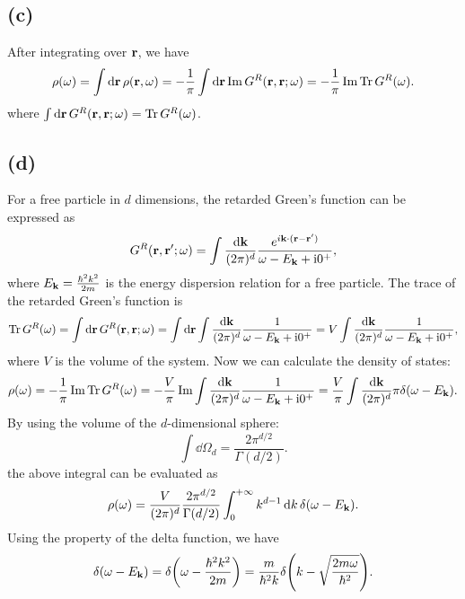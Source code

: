 \documentclass{article}
\newcommand{\ii}{\mathrm{i}}
\begin{document}
\subsection*{(c)}
After integrating over $\vb{r}$, we have
\begin{equation}
    \rho(\omega)=\int \dd{\vb{r}}\rho(\vb{r},\omega)=-\frac{1}{\pi}\int \dd{\vb{r}}\Im G^{R}(\vb{r},\vb{r};\omega)=-\frac{1}{\pi}\Im \Tr G^{R}(\omega).
\end{equation}
where $\int \dd{\vb{r}}G^{R}(\vb{r},\vb{r};\omega)=\Tr G^{R}(\omega)$.

\subsection*{(d)}
For a free particle in $d$ dimensions, the retarded Green's function can be expressed as
\begin{equation}
    G^{R}(\vb{r},\vb{r}';\omega)=\int \frac{\dd{\vb{k}}}{(2\pi)^d}\frac{e^{i\vb{k}\cdot(\vb{r}-\vb{r'})}}{\omega-E_{\vb{k}}+\ii 0^+},
\end{equation}
where $E_{\vb{k}}=\frac{\hbar^2 k^2}{2m}$ is the energy dispersion relation for a free particle.
The trace of the retarded Green's function is
\begin{equation}
    \Tr G^{R}(\omega)=\int \dd{\vb{r}}G^{R}(\vb{r},\vb{r};\omega)=\int \dd{\vb{r}}\int \frac{\dd{\vb{k}}}{(2\pi)^d}\frac{1}{\omega-E_{\vb{k}}+\ii 0^+}=V\int \frac{\dd{\vb{k}}}{(2\pi)^d}\frac{1}{\omega-E_{\vb{k}}+\ii 0^+},
\end{equation}
where $V$ is the volume of the system.
Now we can calculate the density of states:
\begin{equation}
    \rho(\omega)=-\frac{1}{\pi}\Im \Tr G^{R}(\omega)=-\frac{V}{\pi}\Im \int \frac{\dd{\vb{k}}}{(2\pi)^d}\frac{1}{\omega-E_{\vb{k}}+\ii 0^+}=\frac{V}{\pi}\int \frac{\dd{\vb{k}}}{(2\pi)^d}\pi \delta(\omega-E_{\vb{k}}).
\end{equation}
By using the volume of the $d$-dimensional sphere:
\begin{equation}
    \int \dd{\Omega_d}=\frac{2\pi^{d/2}}{\Gamma(d/2)}.
\end{equation}
the above integral can be evaluated as
\begin{equation}
    \rho(\omega)=\frac{V}{(2\pi)^d}\frac{2\pi^{d/2}}{\Gamma(d/2)}\int_0^{+\infty} k^{d-1}\dd{k}\delta(\omega-E_{\vb{k}}).
\end{equation}
Using the property of the delta function, we have
\begin{equation}
    \delta(\omega-E_{\vb{k}})=\delta\qty(\omega-\frac{\hbar^2 k^2}{2m})=\frac{m}{\hbar^2 k}\delta\qty(k-\sqrt{\frac{2m\omega}{\hbar^2}}).
\end{equation}
\end{document}
